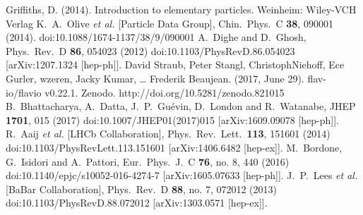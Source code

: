 \documentclass[12pt]{article}
\begin{document}
\begin{thebibliography}{9}
Griffiths, D. (2014). Introduction to elementary particles. Weinheim: Wiley-VCH Verlag
  K.~A.~Olive {\it et al.} [Particle Data Group],
  Chin.\ Phys.\ C {\bf 38}, 090001 (2014).
  doi:10.1088/1674-1137/38/9/090001
  A.~Dighe and D.~Ghosh,
  Phys.\ Rev.\ D {\bf 86}, 054023 (2012)
  doi:10.1103/PhysRevD.86.054023
  [arXiv:1207.1324 [hep-ph]].
    David Straub, Peter Stangl, ChristophNiehoff, Ece Gurler, wzeren, Jacky Kumar, … Frederik Beaujean. (2017, June 29). flav-io/flavio v0.22.1. Zenodo. http://doi.org/10.5281/zenodo.821015
  B.~Bhattacharya, A.~Datta, J.~P.~Guévin, D.~London and R.~Watanabe,
  JHEP {\bf 1701}, 015 (2017)
  doi:10.1007/JHEP01(2017)015
  [arXiv:1609.09078 [hep-ph]].
  R.~Aaij {\it et al.} [LHCb Collaboration],
  Phys.\ Rev.\ Lett.\  {\bf 113}, 151601 (2014)
  doi:10.1103/PhysRevLett.113.151601
  [arXiv:1406.6482 [hep-ex]].
  M.~Bordone, G.~Isidori and A.~Pattori,
  Eur.\ Phys.\ J.\ C {\bf 76}, no. 8, 440 (2016)
  doi:10.1140/epjc/s10052-016-4274-7
  [arXiv:1605.07633 [hep-ph]].
  J.~P.~Lees {\it et al.} [BaBar Collaboration],
  Phys.\ Rev.\ D {\bf 88}, no. 7, 072012 (2013)
  doi:10.1103/PhysRevD.88.072012
  [arXiv:1303.0571 [hep-ex]].

\end{thebibliography}
\end{document}
